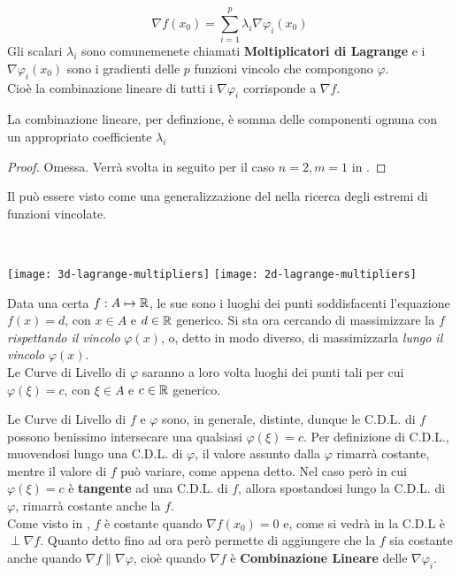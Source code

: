 \begin{theorem}
\begin{equation}
		\label{eq:eqiv_nabl_molt_lagr}
		\nabla f(x_0) = \sum\limits_{i = 1}^{p} \lambda_i \nabla \varphi_i (x_0)
	\end{equation}
	Gli scalari $\lambda_i$ sono comunemenete chiamati \textbf{Moltiplicatori di Lagrange} e i $\nabla \varphi_i (x_0)$ sono i gradienti delle $p$ funzioni vincolo che compongono $\varphi$.\\
	Cioè la combinazione lineare di tutti i $\nabla \varphi_i$ corrisponde a $\nabla f$.
	\begin{note}
		La combinazione lineare, per definzione, è somma delle componenti ognuna con un appropriato coefficiente $\lambda_i$
	\end{note}
	\begin{proof}
		Omessa. Verrà svolta in seguito per il caso $n = 2, m = 1$ in .
	\end{proof}
\end{theorem}
\begin{observation}
	Il  può essere visto come una generalizzazione del  nella ricerca degli estremi di funzioni vincolate.
\end{observation}
\begin{observation}~
	\label{obs:concetto_teo_molt_lagr_gen}
	\begin{center}
		\texttt{[image: 3d-lagrange-multipliers]}
		\texttt{[image: 2d-lagrange-multipliers]}
	\end{center}
	Data una certa $f: A \mapsto \mathbb{R}$, le sue  sono i luoghi dei punti soddisfacenti l'equazione $f(x) = d$, con $x \in A$ e $d \in \mathbb{R}$ generico. Si sta ora cercando di massimizzare la $f$ \textit{rispettando il vincolo} $\varphi(x)$, o, detto in modo diverso, di massimizzarla \textit{lungo il vincolo} $\varphi(x)$.\\
	Le Curve di Livello di $\varphi$ saranno a loro volta luoghi dei punti tali per cui $\varphi(\xi) = c$, con $\xi \in A$ e $c \in \mathbb{R}$ generico.

	Le Curve di Livello di $f$ e $\varphi$ sono, in generale, distinte, dunque le C.D.L. di $f$ possono benissimo intersecare una qualsiasi $\varphi(\xi) = c$. Per definizione di C.D.L., muovendosi lungo una C.D.L. di $\varphi$, il valore assunto dalla $\varphi$ rimarrà costante, mentre il valore di $f$ può variare, come appena detto. Nel caso però in cui $\varphi(\xi) = c$ è \textbf{tangente} ad una C.D.L. di $f$, allora spostandosi lungo la C.D.L. di $\varphi$, rimarrà costante anche la $f$.\\
	Come visto in , $f$ è costante quando $\nabla f(x_0) = 0$ e, come si vedrà in  la C.D.L è $\perp \nabla f$. Quanto detto fino ad ora però permette di aggiungere che la $f$ sia costante anche quando $\nabla f \parallel \nabla \varphi$, cioè quando $\nabla f$ è \textbf{Combinazione Lineare} delle $\nabla \varphi_i$.
\end{observation}
